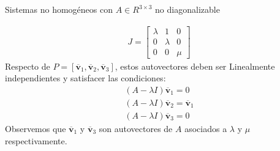 \documentclass[a4paper, twoside]{article}
\numberwithin{equation}{section}
\numberwithin{figure}{section}
\numberwithin{table}{section}
\newcommand{\vect}[1]{\overline{\textbf{#1}}}
\begin{document}
\begin{corolario}{Sistemas no homogéneos con $A \in R^{3 \times 3}$ no diagonalizable}
\begin{enumerate}
\begin{align}
      J=\begin{bmatrix} {\lambda}&{1}&{0} \\ {0}&{\lambda}&{0} \\ {0}&{0}&{\mu} \end{bmatrix}
    \end{align}
    Respecto de $P=[\vect{v}_1,\vect{v}_2,\vect{v}_3]$, estos autovectores deben ser Linealmente independientes y satisfacer las condiciones:
    \begin{align}
      \left( A-\lambda I \right)\vect{v}_1=0 \\
      \left( A-\lambda I \right)\vect{v}_2=\vect{v}_1 \\
      \left( A-\lambda I \right)\vect{v}_3=0
    \end{align}
    Observemos que $\vect{v}_1$ y $\vect{v}_3$ son autovectores de $A$ asociados a $\lambda$ y $\mu$ respectivamente.
  \end{enumerate}
\end{corolario}


\makeseccioncolaboradores %

\makehistorial
\end{document}

